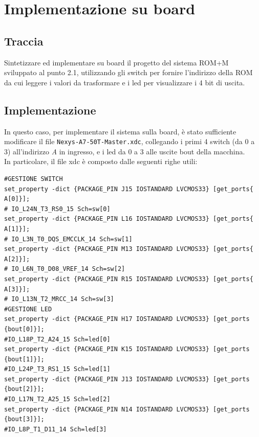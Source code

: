 \section{Implementazione su board}
\subsection{Traccia}
 Sintetizzare ed implementare su board il progetto del sistema ROM+M sviluppato al punto 2.1, utilizzando gli switch per fornire l'indirizzo della ROM da cui leggere i valori da trasformare e i led per visualizzare i 4 bit di uscita.

\subsection{Implementazione}
In questo caso, per implementare il sistema sulla board, è stato sufficiente modificare il file \texttt{Nexys-A7-50T-Master.xdc}, collegando i primi 4 switch (da 0 a 3) all'indirizzo \textit{A} in ingresso, e i led da 0 a 3 alle uscite bout della macchina.\\
In particolare, il file xdc è composto dalle seguenti righe utili:
{\footnotesize
\begin{verbatim}
#GESTIONE SWITCH
set_property -dict {PACKAGE_PIN J15 IOSTANDARD LVCMOS33} [get_ports{ A[0]}]; 
# IO_L24N_T3_RS0_15 Sch=sw[0]
set_property -dict {PACKAGE_PIN L16 IOSTANDARD LVCMOS33} [get_ports{ A[1]}]; 
# IO_L3N_T0_DQS_EMCCLK_14 Sch=sw[1]
set_property -dict {PACKAGE_PIN M13 IOSTANDARD LVCMOS33} [get_ports{ A[2]}]; 
# IO_L6N_T0_D08_VREF_14 Sch=sw[2]
set_property -dict {PACKAGE_PIN R15 IOSTANDARD LVCMOS33} [get_ports{ A[3]}]; 
# IO_L13N_T2_MRCC_14 Sch=sw[3]
#GESTIONE LED
set_property -dict {PACKAGE_PIN H17 IOSTANDARD LVCMOS33} [get_ports {bout[0]}]; 
#IO_L18P_T2_A24_15 Sch=led[0]
set_property -dict {PACKAGE_PIN K15 IOSTANDARD LVCMOS33} [get_ports {bout[1]}]; 
#IO_L24P_T3_RS1_15 Sch=led[1]
set_property -dict {PACKAGE_PIN J13 IOSTANDARD LVCMOS33} [get_ports {bout[2]}]; 
#IO_L17N_T2_A25_15 Sch=led[2]
set_property -dict {PACKAGE_PIN N14 IOSTANDARD LVCMOS33} [get_ports {bout[3]}]; 
#IO_L8P_T1_D11_14 Sch=led[3]
\end{verbatim}
}

